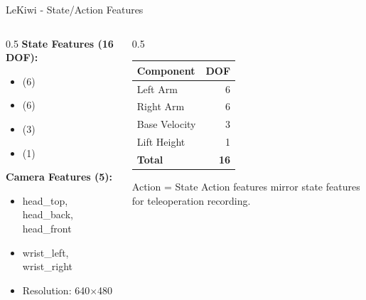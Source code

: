 \begin{frame}{LeKiwi - State/Action Features}
\begin{columns}
\begin{column}{0.5\textwidth}
    \textbf{State Features (16 DOF):}
    \begin{itemize}
        \item {} (6)
        \item {} (6)
        \item {} (3)
        \item {} (1)
    \end{itemize}

    \vspace{0.3cm}

    \textbf{Camera Features (5):}
    \begin{itemize}
        \item head\_top, head\_back, head\_front
        \item wrist\_left, wrist\_right
        \item Resolution: 640$\times$480
    \end{itemize}
\end{column}
\begin{column}{0.5\textwidth}
    \begin{table}
    \centering
    \footnotesize
    \begin{tabular}{lr}
    \toprule
    \textbf{Component} & \textbf{DOF} \\
    \midrule
    Left Arm & 6 \\
    Right Arm & 6 \\
    Base Velocity & 3 \\
    Lift Height & 1 \\
    \midrule
    \textbf{Total} & \textbf{16} \\
    \bottomrule
    \end{tabular}
    \end{table}

    \vspace{0.3cm}

    \begin{block}{Action = State}
    Action features mirror state features for teleoperation recording.
    \end{block}
\end{column}
\end{columns}
\end{frame}

